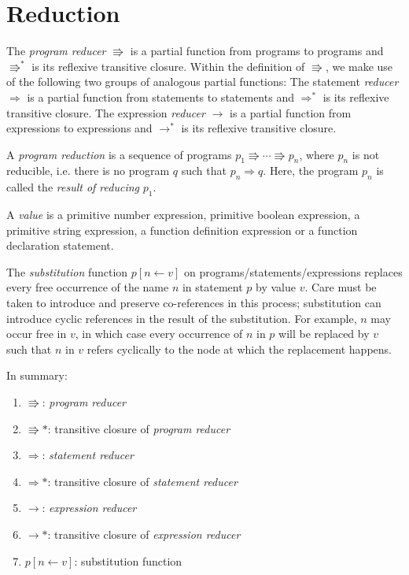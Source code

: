 \section*{Reduction}

The 
\emph{program reducer} $\Rrightarrow$ is a partial function from
programs to
programs
and $\Rrightarrow^*$ is its reflexive transitive closure.
Within the definition of $\Rrightarrow$, we make use of
the following two groups of analogous partial functions:
The statement
\emph{reducer} $\Rightarrow$ is a partial function from
statements to statements
and $\Rightarrow^*$ is its reflexive transitive closure.
The expression
\emph{reducer} $\rightarrow$ is a partial function from
expressions to expressions
and $\rightarrow^*$ is its reflexive transitive closure.

A \emph{program reduction} is a sequence of programs
$p_1 \Rrightarrow \cdots \Rrightarrow p_n$,
where $p_n$ is not reducible, i.e. there is no
program $q$ such that $p_n \Rightarrow q$.
Here, the program $p_n$ is called the \emph{result
of reducing} $p_1$.

A \emph{value} is a primitive number expression,
primitive boolean expression,
a primitive string expression, a function definition
expression or a function declaration statement.

The \emph{substitution} function 
$p [ n \leftarrow v ]$ on programs/statements/expressions
replaces every free occurrence of the name $n$
in statement $p$ by value $v$. Care must be taken to introduce
and preserve
co-references in this process; substitution can introduce
cyclic references in the result of the substitution. For example,
$n$ may occur free in $v$, in which case
every occurrence of $n$ in $p$
will be replaced by $v$ such that $n$ in $v$ refers cyclically
to the node at which the replacement happens.

In summary:

\begin{enumerate}
\item $\Rrightarrow$: \emph{program reducer}
\item $\Rrightarrow*$: transitive closure of \emph{program reducer}
\item $\Rightarrow$: \emph{statement reducer}
\item $\Rightarrow*$: transitive closure of \emph{statement reducer}
\item $\rightarrow$: \emph{expression reducer}
\item $\rightarrow*$: transitive closure of \emph{expression reducer}
\item $p [ n \leftarrow v ]$: substitution function
\end{enumerate}

